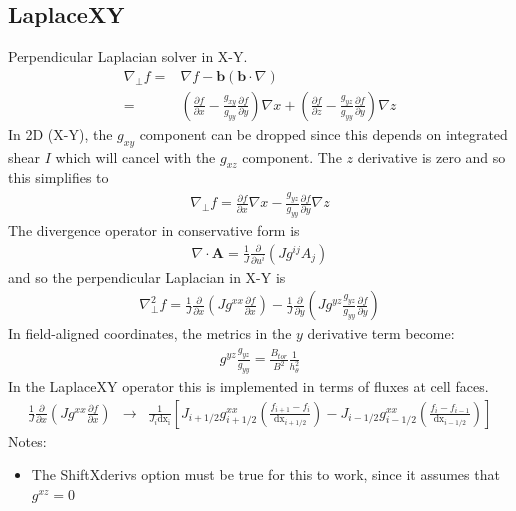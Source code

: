 \documentclass[12pt]{article}
\begin{document}
\subsection{LaplaceXY}
%
\label{sec:LaplaceXY}
%
Perpendicular Laplacian solver in X-Y.
%
\begin{align}
\nabla_\perp f =& \nabla f - \mathbf{b}\left(\mathbf{b}\cdot\nabla\right)
    \nonumber \\ =& \left(\frac{\partial f}{\partial x} -
\frac{g_{xy}}{g_{yy}}\frac{\partial f}{\partial y}\right)\nabla x +
\left(\frac{\partial f}{\partial z} - \frac{g_{yz}}{g_{yy}}\frac{\partial
f}{\partial y}\right)\nabla z
%
\label{eq:nabl_perp_f}
%
\end{align}
%
In 2D (X-Y), the $g_{xy}$ component can be dropped since this depends on
integrated shear $I$ which will cancel with the $g_{xz}$ component. The $z$
derivative is zero and so this simplifies to
%
\begin{align*}
\nabla_\perp f = \frac{\partial f}{\partial x}\nabla x -
\frac{g_{yz}}{g_{yy}}\frac{\partial f}{\partial y}\nabla z
\end{align*}
%
The divergence operator in conservative form is
%
\begin{align*}
\nabla\cdot\mathbf{A} = \frac{1}{J}\frac{\partial}{\partial
u^i}\left(Jg^{ij}A_j\right)
\end{align*}
%
and so the perpendicular Laplacian in X-Y is
%
\begin{align*}
\nabla_\perp^2f = \frac{1}{J}\frac{\partial}{\partial
x}\left(Jg^{xx}\frac{\partial f}{\partial x}\right) -
\frac{1}{J}\frac{\partial}{\partial
y}\left(Jg^{yz}\frac{g_{yz}}{g_{yy}}\frac{\partial f}{\partial y}\right)
\end{align*}
%
In field-aligned coordinates, the metrics in the $y$ derivative term become:
%
\begin{align*}
g^{yz}\frac{g_{yz}}{g_{yy}} = \frac{B_{tor}}{B^2}\frac{1}{h_\theta^2}
\end{align*}
%
In the LaplaceXY operator this is implemented in terms of fluxes at cell faces.
%
\begin{align*}
\frac{1}{J}\frac{\partial}{\partial x}\left(Jg^{xx}\frac{\partial f}{\partial
x}\right) &\rightarrow&
        \frac{1}{J_i\mathrm{dx_i}}\left[J_{i+1/2}g^{xx}_{i+1/2}\left(\frac{f_{i+1}
            - f_{i}}{\mathrm{dx}_{i+1/2}}\right) -
            J_{i-1/2}g^{xx}_{i-1/2}\left(\frac{f_{i} -
        f_{i-1}}{\mathrm{dx}_{i-1/2}}\right)\right]
\end{align*}
%
Notes:
%
\begin{itemize}
\item The ShiftXderivs option must be true for this to work, since it assumes
    that $g^{xz} = 0$
\end{itemize}
%
\end{document}
